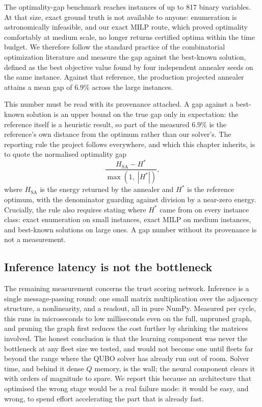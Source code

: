 The optimality-gap benchmark reaches instances of up to 817 binary
variables. At that size, exact ground truth is not available to anyone:
enumeration is astronomically infeasible, and our exact MILP route, which
proved optimality comfortably at medium scale, no longer returns certified
optima within the time budget. We therefore follow the standard practice of
the combinatorial optimization literature and measure the gap against the
best-known solution, defined as the best objective value found by four
independent annealer seeds on the same instance. Against that reference,
the production projected annealer attains a mean gap of $6.9\%$ across the
large instances.

This number must be read with its provenance attached. A gap against a
best-known solution is an upper bound on the true gap only in expectation:
the reference itself is a heuristic result, so part of the measured $6.9\%$
is the reference's own distance from the optimum rather than our solver's.
The reporting rule the project follows everywhere, and which this chapter
inherits, is to quote the normalised optimality gap
\begin{equation}
\frac{H_{\mathrm{SA}} - H^{*}}{\max\!\left(1,\; |H^{*}|\right)},
\end{equation}
where $H_{\mathrm{SA}}$ is the energy returned by the annealer and $H^{*}$
is the reference optimum, with the denominator guarding against division by
a near-zero energy. Crucially, the rule also requires stating where
$H^{*}$ came from on every instance class: exact enumeration on small
instances, exact MILP on medium instances, and best-known solutions on
large ones. A gap number without its provenance is not a measurement.

\subsection{Inference latency is not the bottleneck}
\label{sec:scaling-latency}

The remaining measurement concerns the trust scoring network. Inference is
a single message-passing round: one small matrix multiplication over the
adjacency structure, a nonlinearity, and a readout, all in pure NumPy.
Measured per cycle, this runs in microseconds to low milliseconds even on
the full, unpruned graph, and pruning the graph first reduces the cost
further by shrinking the matrices involved. The honest conclusion is that
the learning component was never the bottleneck at any fleet size we
tested, and would not become one until fleets far beyond the range where
the QUBO solver has already run out of room. Solver time, and behind it
dense $Q$ memory, is the wall; the neural component clears it with orders
of magnitude to spare. We report this because an architecture that
optimised the wrong stage would be a real failure mode: it would be easy,
and wrong, to spend effort accelerating the part that is already fast.

